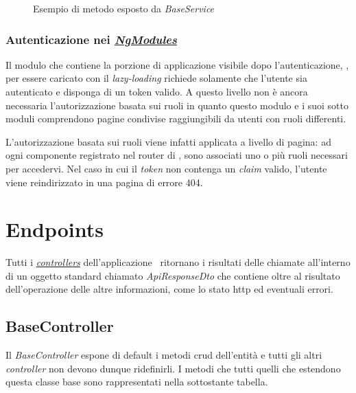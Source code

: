 \begin{figure}[H] 
	\centering    
	
	\caption[Esempio di metodo esposto da \textit{BaseService}]{Esempio di metodo esposto da \textit{BaseService}}
	\label{fig:client-auth-base-service}
\end{figure}

\subsubsection{Autenticazione nei \textit{\hyperref[client:modules]{NgModules}}}

Il modulo che contiene la porzione di applicazione visibile dopo l'autenticazione, \textit{}, per essere caricato con il \textit{lazy-loading} richiede solamente che l'utente sia autenticato e disponga di un token valido. A questo livello non è ancora necessaria l'autorizzazione basata sui ruoli in quanto questo modulo e i suoi sotto moduli comprendono pagine condivise raggiungibili da utenti con ruoli differenti.

L'autorizzazione basata sui ruoli viene infatti applicata a livello di pagina: ad ogni componente registrato nel router di \angular, sono associati uno o più ruoli necessari per accedervi. Nel caso in cui il \textit{token} non contenga un \textit{claim} valido, l'utente viene reindirizzato in una pagina di errore 404.

\section{Endpoints}

Tutti i \hyperref[server:controllers]{\textit{controllers}} dell'applicazione \expressjs~ritornano i risultati delle chiamate all'interno di un oggetto standard chiamato \textit{ApiResponseDto} che contiene oltre al risultato dell'operazione delle altre informazioni, come lo stato \acrshort{http} ed eventuali errori.

\subsection{BaseController}
\label{server:base-controller}
Il \textit{BaseController} espone di default i metodi \acrshort{crud} dell'entità e tutti gli altri \textit{controller} non devono dunque ridefinirli. I metodi che tutti quelli che estendono questa classe base sono rappresentati nella sottostante tabella.

